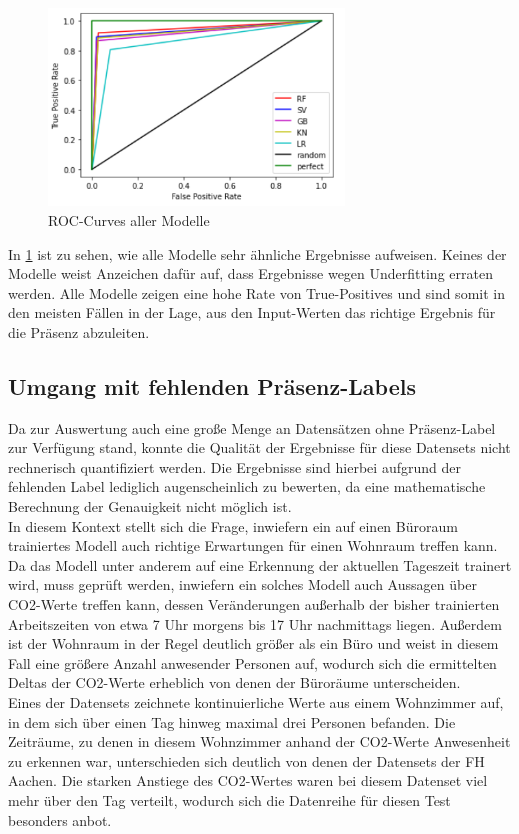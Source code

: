 \begin{figure}[h]
    \centering
    \includegraphics[width=0.7\textwidth]{pic/roc_curves.png}
    \caption{ROC-Curves aller Modelle}
    \label{fig:Roc_curves}
\end{figure}

In \ref{fig:Roc_curves} ist zu sehen, wie alle Modelle sehr ähnliche Ergebnisse aufweisen. Keines der Modelle weist Anzeichen 
dafür auf, dass Ergebnisse wegen Underfitting erraten werden. Alle Modelle zeigen eine hohe Rate von True-Positives und
sind somit in den meisten Fällen in der Lage, aus den Input-Werten das richtige Ergebnis für die Präsenz abzuleiten.  

\newpage

\subsection{Umgang mit fehlenden Präsenz-Labels}
Da zur Auswertung auch eine große Menge an Datensätzen ohne Präsenz-Label zur Verfügung stand, konnte die 
Qualität der Ergebnisse für diese Datensets nicht rechnerisch quantifiziert werden. Die Ergebnisse
sind hierbei aufgrund der fehlenden Label lediglich augenscheinlich zu bewerten, da eine mathematische
Berechnung der Genauigkeit nicht möglich ist.\\
In diesem Kontext stellt sich die Frage, inwiefern ein auf einen Büroraum trainiertes Modell auch richtige
Erwartungen für einen Wohnraum treffen kann.
Da das Modell unter anderem auf eine Erkennung der aktuellen Tageszeit trainert wird, muss geprüft
werden, inwiefern ein solches Modell auch Aussagen über CO2-Werte treffen kann, dessen Veränderungen außerhalb
der bisher trainierten Arbeitszeiten von etwa 7 Uhr morgens bis 17 Uhr nachmittags liegen. 
Außerdem ist der Wohnraum in der Regel deutlich größer als ein Büro und weist in diesem Fall eine größere Anzahl 
anwesender Personen auf, wodurch sich die ermittelten Deltas der CO2-Werte erheblich von denen der Büroräume 
unterscheiden.\\
Eines der Datensets zeichnete kontinuierliche Werte aus einem Wohnzimmer auf, in dem sich über einen 
Tag hinweg maximal drei Personen befanden. Die Zeiträume, zu denen in diesem Wohnzimmer anhand der CO2-Werte
Anwesenheit zu erkennen war, unterschieden sich deutlich von denen der Datensets der FH Aachen. Die 
starken Anstiege des CO2-Wertes waren bei diesem Datenset viel mehr über den Tag verteilt, wodurch sich die 
Datenreihe für diesen Test besonders anbot.

